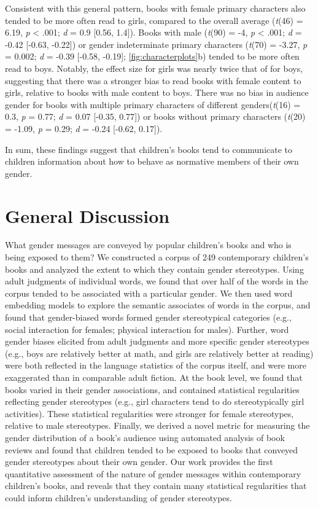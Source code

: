 \documentclass[english,,man,floatsintext]{apa6}
\begin{document}
Consistent with this general pattern, books with female primary characters also tended to be more often read to girls, compared to the overall average (\emph{t}(46) = 6.19, \emph{p} \textless{} .001; \emph{d} = 0.9 {[}0.56, 1.4{]}). Books with male (\emph{t}(90) = -4, \emph{p} \textless{} .001; \emph{d} = -0.42 {[}-0.63, -0.22{]}) or gender indeterminate primary characters (\emph{t}(70) = -3.27, \emph{p} = 0.002; \emph{d} = -0.39 {[}-0.58, -0.19{]}; \autoref{fig:characterplots}b) tended to be more often read to boys. Notably, the effect size for girls was nearly twice that of for boys, suggesting that there was a stronger bias to read books with female content to girls, relative to books with male content to boys. There was no bias in audience gender for books with multiple primary characters of different genders(\emph{t}(16) = 0.3, \emph{p} = 0.77; \emph{d} = 0.07 {[}-0.35, 0.77{]}) or books without primary characters (\emph{t}(20) = -1.09, \emph{p} = 0.29; \emph{d} = -0.24 {[}-0.62, 0.17{]}).

In sum, these findings suggest that children's books tend to communicate to children information about how to behave as normative members of their own gender.

\hypertarget{general-discussion}{%
\section{General Discussion}\label{general-discussion}}

What gender messages are conveyed by popular children's books and who is being exposed to them? We constructed a corpus of 249 contemporary children's books and analyzed the extent to which they contain gender stereotypes. Using adult judgments of individual words, we found that over half of the words in the corpus tended to be associated with a particular gender. We then used word embedding models to explore the semantic associates of words in the corpus, and found that gender-biased words formed gender stereotypical categories (e.g., social interaction for females; physical interaction for males). Further, word gender biases elicited from adult judgments and more specific gender stereotypes (e.g., boys are relatively better at math, and girls are relatively better at reading) were both reflected in the language statistics of the corpus itself, and were more exaggerated than in comparable adult fiction. At the book level, we found that books varied in their gender associations, and contained statistical regularities reflecting gender stereotypes (e.g., girl characters tend to do stereotypically girl activities). These statistical regularities were stronger for female stereotypes, relative to male stereotypes. Finally, we derived a novel metric for measuring the gender distribution of a book's audience using automated analysis of book reviews and found that children tended to be exposed to books that conveyed gender stereotypes about their own gender. Our work provides the first quantitative assessment of the nature of gender messages within contemporary children's books, and reveals that they contain many statistical regularities that could inform children's understanding of gender stereotypes.
\end{document}

